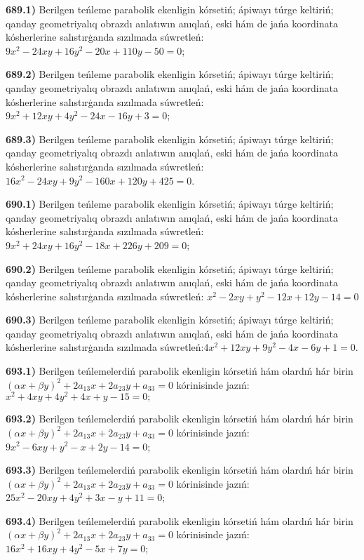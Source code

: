 \textbf{689.1)} Berilgen teńleme parabolik ekenligin kórsetiń; ápiwayı túrge keltiriń; qanday geometriyalıq obrazdı anlatıwın anıqlań, eski hám de jańa koordinata kósherlerine salıstırģanda sızılmada súwretleń:$9 x^2-24 x y+16 y^2-20 x+110 y-50=0$;

\textbf{689.2)} Berilgen teńleme parabolik ekenligin kórsetiń; ápiwayı túrge keltiriń; qanday geometriyalıq obrazdı anlatıwın anıqlań, eski hám de jańa koordinata kósherlerine salıstırģanda sızılmada súwretleń:$9 x^2+12 x y+4 y^2-24 x-16 y+3=0$;

\textbf{689.3)} Berilgen teńleme parabolik ekenligin kórsetiń; ápiwayı túrge keltiriń; qanday geometriyalıq obrazdı anlatıwın anıqlań, eski hám de jańa koordinata kósherlerine salıstırģanda sızılmada súwretleń:$16 x^2-24 x y+9 y^2-160 x+120 y+425=0$.

\textbf{690.1)} Berilgen teńleme parabolik ekenligin kórsetiń; ápiwayı túrge keltiriń; qanday geometriyalıq obrazdı anlatıwın anıqlań, eski hám de jańa koordinata kósherlerine salıstırģanda sızılmada súwretleń: $9 x^2+24 x y+16 y^2-18 x+226 y+209=0$;

\textbf{690.2)} Berilgen teńleme parabolik ekenligin kórsetiń; ápiwayı túrge keltiriń; qanday geometriyalıq obrazdı anlatıwın anıqlań, eski hám de jańa koordinata kósherlerine salıstırģanda sızılmada súwretleń: $x^2-2 x y+y^2-12 x+12 y-14=0$

\textbf{690.3)} Berilgen teńleme parabolik ekenligin kórsetiń; ápiwayı túrge keltiriń; qanday geometriyalıq obrazdı anlatıwın anıqlań, eski hám de jańa koordinata kósherlerine salıstırģanda sızılmada súwretleń:$4 x^2+12 x y+9 y^2-4 x-6 y+1=0$.

\textbf{693.1)} Berilgen teńlemelerdiń parabolik ekenligin kórsetiń hám olardıń hár birin $(\alpha x+\beta y)^2+2 a_{13} x+2 a_{23} y+a_{33}=0$ kórinisinde jazıń: $x^2+4 x y+4 y^2+4 x+y-15=0 ;$

\textbf{693.2)} Berilgen teńlemelerdiń parabolik ekenligin kórsetiń hám olardıń hár birin $(\alpha x+\beta y)^2+2 a_{13} x+2 a_{23} y+a_{33}=0$ kórinisinde jazıń: $9 x^2-6 x y+y^2-x+2 y-14=0$;

\textbf{693.3)} Berilgen teńlemelerdiń parabolik ekenligin kórsetiń hám olardıń hár birin $(\alpha x+\beta y)^2+2 a_{13} x+2 a_{23} y+a_{33}=0$ kórinisinde jazıń: $25 x^2-20 x y+4 y^2+3 x-y+11=0$;

\textbf{693.4)} Berilgen teńlemelerdiń parabolik ekenligin kórsetiń hám olardıń hár birin $(\alpha x+\beta y)^2+2 a_{13} x+2 a_{23} y+a_{33}=0$ kórinisinde jazıń:  $16 x^2+16 x y+4 y^2-5 x+7 y=0$;

